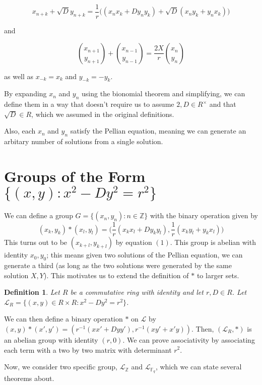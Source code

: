 \documentclass{article}
\newtheorem{definition}{Definition}
\begin{document}
\begin{equation}
x_{n+k} + \sqrt{D}y_{n+k} = \frac{1}{r} \bigg ( (x_nx_k + Dy_ny_k) + \sqrt{D}(x_ny_k + y_nx_k) \bigg )
\end{equation}

and

\begin{equation}
\binom{x_{n+1}}{y_{n+1}} + \binom{x_{n-1}}{y_{n-1}} = \frac{2X}{r}\binom{x_n}{y_n}
\end{equation}

as well as $x_{-k} = x_k$ and $y_{-k} = -y_k$.

By expanding $x_n$ and $y_n$ using the bionomial theorem and simplifying, we can define them in a way that doesn't require us to assume $2, D \in R^{\times}$ and that $\sqrt{D} \in R$, which we assumed in the original definitions. 

Also, each $x_n$ and $y_n$ satisfy the Pellian equation, meaning we can generate an arbitary number of solutions from a single solution.

\section{Groups of the Form $\{ (x,y) : x^2 - Dy^2 = r^2 \}$}

We can define a group $G = \{(x_n,y_n) : n \in \mathbb{Z} \}$ with the binary operation given by $$(x_k,y_k) * (x_l, y_l) = \bigg (\frac{1}{r}(x_kx_l + Dy_ky_l), \frac{1}{r}(x_ky_l + y_kx_l) \bigg ) $$ This turns out to be $(x_{k+l},y_{k+l})$ by equation $(1)$. This group is abelian with identity $x_0, y_0$; this means given two solutions of the Pellian equation, we can generate a third (as long as the two solutions were generated by the same solution $X,Y$). This motivates us to extend the definition of $*$ to larger sets.

\begin{definition}
	Let $R$ be a commutative ring with identity and let $r, D \in R$. Let $\mathcal{L}_R = \{(x,y) \in R \times R: x^2 - Dy^2 = r^2 \}$.
\end{definition}

We can then define a binary operation $*$ on $\mathcal{L}$ by $(x,y)*(x',y') = (r^{-1}(xx'+Dyy'),r^{-1}(xy'+x'y))$. Then, $(\mathcal{L}_R, *)$ is an abelian group with identity $(r,0)$. We can prove associativity by associating each term with a two by two matrix with determinant $r^2$.

Now, we consider two specific group, $\mathcal{L}_{\mathbb{Z}}$ and $\mathcal{L}_{\mathbb{F}_q}$, which we can state several theorems about.
\end{document}
